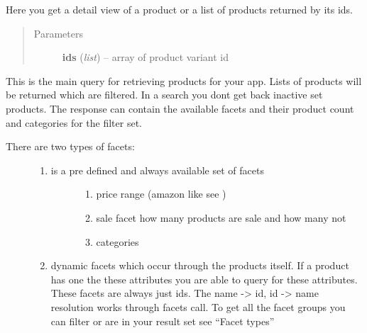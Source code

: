 \documentclass[letterpaper,10pt,english]{sphinxmanual}
\begin{document}
\begin{fulllineitems}

\begin{fulllineitems}
\label{collins:collins.Collins.products}
Here you get a detail view of a product or a list of products returned
by its ids.
\begin{quote}\begin{description}
\item[{Parameters}] \leavevmode
\textbf{ids} (\emph{list}) -- array of product variant id

\end{description}\end{quote}

\end{fulllineitems}


\begin{fulllineitems}
\label{collins:collins.Collins.productsearch}
This is the main query for retrieving products for your app.
Lists of products will be returned which are filtered.
In a search you dont get back inactive set products.
The response can contain the available facets and their product count
and categories for the filter set.
\begin{description}
\item[{There are two types of facets:}] \leavevmode\begin{enumerate}
\item {} \begin{description}
\item[{is a pre defined and always available set of facets}] \leavevmode\begin{enumerate}
\item {} 
price range (amazon like see )

\item {} 
sale facet how many products are sale and how many not

\item {} 
categories

\end{enumerate}

\end{description}

\item {} 
dynamic facets which occur through the products itself. If a
product has one the these attributes you are able to query for
these attributes. These facets are always just ids.
The name -\textgreater{} id, id -\textgreater{} name resolution works through facets call.
To get all the facet groups you can filter or are in your result
set see ``Facet types''


\end{enumerate}
\end{description}
\end{fulllineitems}
\end{fulllineitems}
\end{document}
